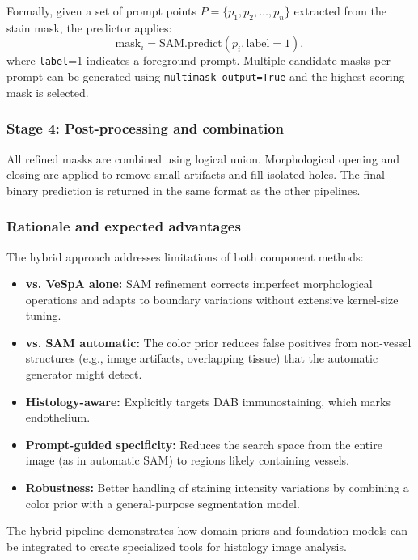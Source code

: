Formally, given a set of prompt points $P = \{p_1, p_2, \ldots, p_n\}$ extracted from the stain mask, the predictor applies:
\[
\text{mask}_i = \text{SAM.predict}(p_i, \text{label}=1),
\]
where \texttt{label}=1 indicates a foreground prompt. Multiple candidate masks per prompt can be generated using \texttt{multimask\_output=True} and the highest-scoring mask is selected.

\subsubsection{Stage 4: Post-processing and combination}
All refined masks are combined using logical union. Morphological opening and closing are applied to remove small artifacts and fill isolated holes. The final binary prediction is returned in the same format as the other pipelines.

\subsubsection{Rationale and expected advantages}

The hybrid approach addresses limitations of both component methods:
\begin{itemize}
    \item \textbf{vs. VeSpA alone:} SAM refinement corrects imperfect morphological operations and adapts to boundary variations without extensive kernel-size tuning.
    \item \textbf{vs. SAM automatic:} The color prior reduces false positives from non-vessel structures (e.g., image artifacts, overlapping tissue) that the automatic generator might detect.
    \item \textbf{Histology-aware:} Explicitly targets DAB immunostaining, which marks endothelium.
    \item \textbf{Prompt-guided specificity:} Reduces the search space from the entire image (as in automatic SAM) to regions likely containing vessels.
    \item \textbf{Robustness:} Better handling of staining intensity variations by combining a color prior with a general-purpose segmentation model.
\end{itemize}

The hybrid pipeline demonstrates how domain priors and foundation models can be integrated to create specialized tools for histology image analysis.
